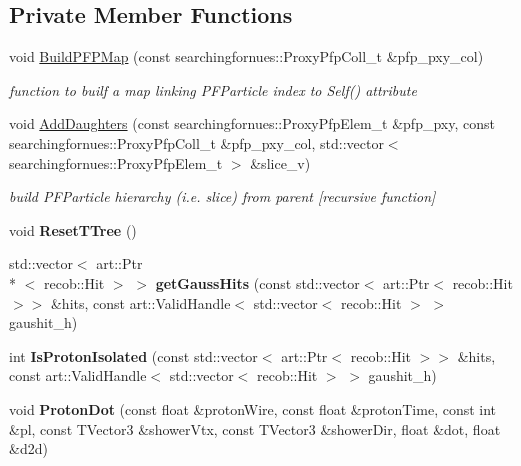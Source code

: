 \subsection*{Private Member Functions}
\begin{DoxyCompactItemize}
\item 
void \hyperlink{classProtonHitPurity_adfed832259669bb323f5a6a4eae7107e}{Build\-P\-F\-P\-Map} (const searchingfornues\-::\-Proxy\-Pfp\-Coll\-\_\-t \&pfp\-\_\-pxy\-\_\-col)
\begin{DoxyCompactList}\small\item\em function to builf a map linking P\-F\-Particle index to Self() attribute \end{DoxyCompactList}\item 
void \hyperlink{classProtonHitPurity_a7e468a256d51c80933e9bb9b6be77b94}{Add\-Daughters} (const searchingfornues\-::\-Proxy\-Pfp\-Elem\-\_\-t \&pfp\-\_\-pxy, const searchingfornues\-::\-Proxy\-Pfp\-Coll\-\_\-t \&pfp\-\_\-pxy\-\_\-col, std\-::vector$<$ searchingfornues\-::\-Proxy\-Pfp\-Elem\-\_\-t $>$ \&slice\-\_\-v)
\begin{DoxyCompactList}\small\item\em build P\-F\-Particle hierarchy (i.\-e. slice) from parent \mbox{[}recursive function\mbox{]} \end{DoxyCompactList}\item 
\hypertarget{classProtonHitPurity_a516f5e25d7f5889fb24fb81fc3ed4697}{void {\bfseries Reset\-T\-Tree} ()}\label{classProtonHitPurity_a516f5e25d7f5889fb24fb81fc3ed4697}

\item 
\hypertarget{classProtonHitPurity_af073c27c1dd243faec1019466e52dfdd}{std\-::vector$<$ art\-::\-Ptr\\*
$<$ recob\-::\-Hit $>$ $>$ {\bfseries get\-Gauss\-Hits} (const std\-::vector$<$ art\-::\-Ptr$<$ recob\-::\-Hit $>$$>$ \&hits, const art\-::\-Valid\-Handle$<$ std\-::vector$<$ recob\-::\-Hit $>$ $>$ gaushit\-\_\-h)}\label{classProtonHitPurity_af073c27c1dd243faec1019466e52dfdd}

\item 
\hypertarget{classProtonHitPurity_a7e9943415393cbdd5fbea2362e3a76e2}{int {\bfseries Is\-Proton\-Isolated} (const std\-::vector$<$ art\-::\-Ptr$<$ recob\-::\-Hit $>$$>$ \&hits, const art\-::\-Valid\-Handle$<$ std\-::vector$<$ recob\-::\-Hit $>$ $>$ gaushit\-\_\-h)}\label{classProtonHitPurity_a7e9943415393cbdd5fbea2362e3a76e2}

\item 
\hypertarget{classProtonHitPurity_a4b71c7c7e85e49f74bc98960166d1fcc}{void {\bfseries Proton\-Dot} (const float \&proton\-Wire, const float \&proton\-Time, const int \&pl, const T\-Vector3 \&shower\-Vtx, const T\-Vector3 \&shower\-Dir, float \&dot, float \&d2d)}\label{classProtonHitPurity_a4b71c7c7e85e49f74bc98960166d1fcc}


\end{DoxyCompactItemize}
